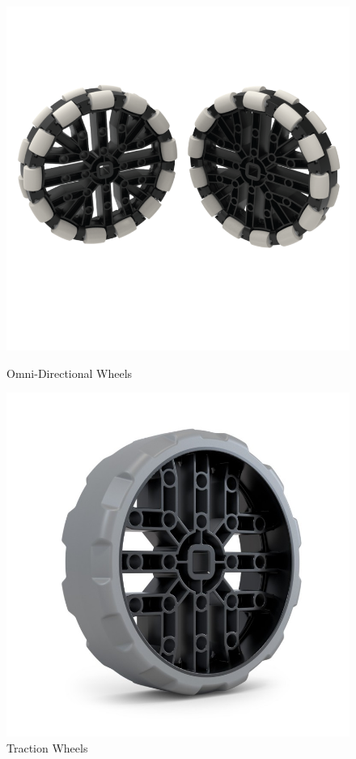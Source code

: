 \begin{figure}[hbt!] %
    \begin{minipage}{.5\textwidth}
        \centering
        \includegraphics[width=.8\linewidth]{images/Omni Wheels.jpg}
        \caption{Omni-Directional Wheels}
        \label{fig:omni-directional-wheels}
    \end{minipage}%
    \begin{minipage}{.5\textwidth}
        \centering
        \includegraphics[width=.8\linewidth]{images/Traction Wheels.jpg}
        \caption{Traction Wheels}

\end{minipage}
\end{figure}
